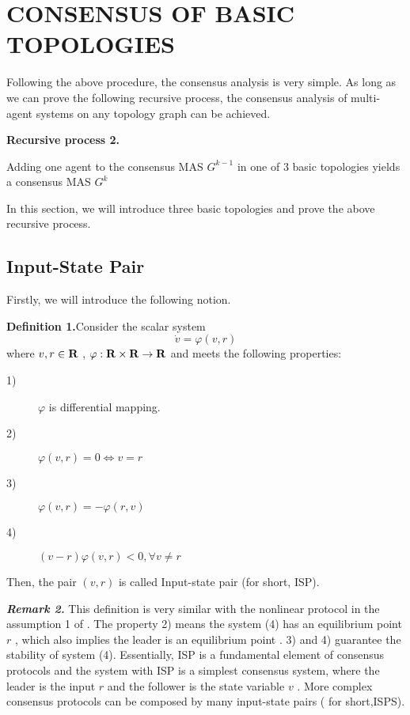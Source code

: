 \documentclass[english]{cccconf}
\begin{document}
{\section{CONSENSUS OF BASIC TOPOLOGIES}

Following the above procedure, the consensus analysis is very simple. As long as we can prove the following recursive process, the consensus analysis of  multi-agent systems on any topology graph can be achieved.

{\textbf{Recursive process 2.}

{Adding} one agent to the consensus MAS $G^{k-1}$ {in} one of 3 basic topologies  {yields} a consensus  MAS $G^{k}$


In this section, we will introduce three basic topologies and prove the above recursive process.

\subsection{Input-State Pair}
Firstly, we will introduce the following notion.

{\textbf{Definition  1.}}Consider the scalar system
\begin{equation}  \label{13}
\dot v = \varphi (v,r)
\end{equation}
where $v,r \in {\bf{R}}$ , $\varphi :{\bf{R}} \times {\bf{R}} \to {\bf{R}}$ and meets the following properties:
\begin{description}
  \item[1)] $\varphi$ is differential mapping.
  \item[2)] $\varphi (v,r) = 0 \Leftrightarrow v = r$
  \item[3)] $\varphi (v,r) =  - \varphi (r,v)$
  \item[4)] $(v - r)\varphi (v,r) < 0,\forall v \ne r$
\end{description}
Then, the  pair $(v,r)$  is called Input-state pair (for short, ISP).

\emph{\textbf{Remark 2. }} This definition is very similar with the nonlinear protocol in the assumption 1 of \cite{Liu2009}. The  property 2) means the system (4) has an equilibrium point $r$ , which also implies the leader is an equilibrium point .  3) and 4) guarantee the stability of system (4). Essentially, ISP is a fundamental element of consensus protocols and the system with ISP is a simplest consensus system, where the leader is the input $r$  and the follower is the state variable $v$ .  More complex consensus protocols can be composed by many  input-state pairs ( for short,ISPS).

}}
\end{document}
